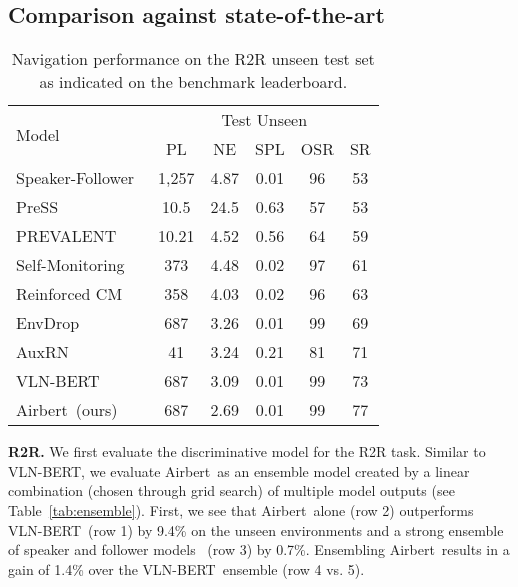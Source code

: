 \RequirePackage[dvipsnames,table]{xcolor} \documentclass[10pt,twocolumn,letterpaper]{article}
\newcommand{\p}[1]{\vspace{1mm}\noindent\textbf{#1}}
\newcommand{\vlnbert}{VLN-BERT}
\newcommand{\airbert}{Airbert}
\newcommand{\h}{\cellcolor{Gray}}
\begin{document}
\subsection{Comparison against state-of-the-art}
\label{sec:xp_sota}
\begin{table}[t]
\centering
\small
\tabcolsep=0.13cm
\begin{tabular}{l ccccc}
\toprule
\multirow{2}{*}{Model} & \multicolumn{5}{c}{Test Unseen} \\ \cline{2-6}
 & PL & NE & SPL & OSR & SR \\
\midrule
Speaker-Follower~\cite{fried2018speaker} & 1,257 & 4.87 & 0.01 & 96 & \h 53 \\
PreSS~\cite{li2019press} & 10.5 & 24.5 & 0.63 & 57 & \h 53  \\
PREVALENT~\cite{hao2020prevalent} & 10.21 & 4.52 & 0.56 & 64 & \h 59 \\
Self-Monitoring~\cite{ma2019self} & 373 & 4.48 & 0.02 & 97 & \h 61 \\
Reinforced CM~\cite{wang2019reinforced} & 358 & 4.03 & 0.02 & 96 & \h 63 \\
EnvDrop~\cite{anderson2018r2r} & 687 & 3.26 & 0.01 & 99 & \h 69 \\
AuxRN~\cite{zhu2020auxrn} & 41 & 3.24 & 0.21 & 81 & \h 71 \\
\vlnbert~\cite{majumdar2020vlnbert} & 687 & 3.09 & 0.01 & 99 &  \h73 \\
\midrule
\airbert~(ours) & 687 & 2.69 & 0.01 & 99 & \h 77 \\
\bottomrule
\end{tabular}
\vspace{-2mm}
\caption{Navigation performance on the R2R unseen test set as indicated on the benchmark leaderboard.}
\vspace{-2mm}
\label{tab:testset}
\end{table}

%
 

\p{R2R.}
We first evaluate the discriminative model for the R2R task.
Similar to \vlnbert, we evaluate \airbert~as an ensemble model created by a linear combination (chosen through grid search) of multiple model outputs (see Table~\ref{tab:ensemble}).
First, we see that \airbert~alone (row 2) outperforms \vlnbert~(row 1) by 9.4\% on the unseen environments and a strong ensemble of speaker and follower models~\cite{tan2019envdrop} (row 3) by 0.7\%.
Ensembling \airbert~results in a gain of 1.4\% over the \vlnbert~ensemble (row 4 vs. 5).
\end{document}

